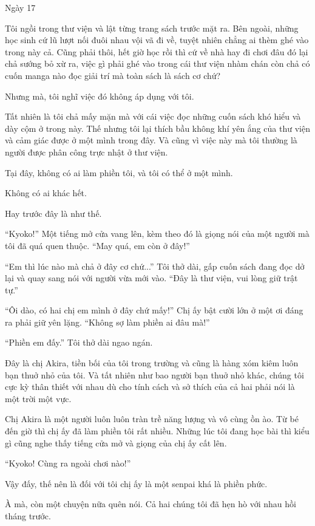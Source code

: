 {Ngày 17}
{
Tôi ngồi trong thư viện và lật từng trang sách trước mặt ra. Bên ngoài,
những học sinh cứ lũ lượt nối đuôi nhau vội vã đi về, tuyệt nhiên chẳng
ai thèm ghé vào trong này cả. Cũng phải thôi, hết giờ học rồi thì cứ về
nhà hay đi chơi đâu đó lại chả sướng bỏ xừ ra, việc gì phải ghé vào
trong cái thư viện nhàm chán còn chả có cuốn manga nào đọc giải trí mà
toàn sách là sách cơ chứ?

Nhưng mà, tôi nghĩ việc đó không áp dụng với tôi.

Tất nhiên là tôi chả mấy mặn mà với cái việc đọc những cuốn sách khó
hiểu và dày cộm ở trong này. Thế nhưng tôi lại thích bầu không khí yên
ắng của thư viện và cảm giác được ở một mình trong đây. Và cũng vì việc
này mà tôi thường là người được phân công trực nhật ở thư viện.

Tại đây, không có ai làm phiền tôi, và tôi có thể ở một mình.

Không có ai khác hết.

Hay trước đây là như thế.

``Kyoko!'' Một tiếng mở cửa vang lên, kèm theo đó là giọng nói của một
người mà tôi đã quá quen thuộc. ``May quá, em còn ở đây!''

``Em thì lúc nào mà chả ở đây cơ chứ...'' Tôi thở dài, gấp cuốn sách
đang đọc dở lại và quay sang nói với người vừa mới vào. ``Đây là thư
viện, vui lòng giữ trật tự.''

``Ôi dào, có hai chị em mình ở đây chứ mấy!'' Chị ấy bật cười lớn ở một
ơi đáng ra phải giữ yên lặng. ``Không sợ làm phiền ai đâu mà!''

``Phiền em đấy.'' Tôi thở dài ngao ngán.

Đây là chị Akira, tiền bối của tôi trong trường và cũng là hàng xóm kiêm
luôn bạn thuở nhỏ của tôi. Và tất nhiên như bao người bạn thuở nhỏ khác,
chúng tôi cực kỳ thân thiết với nhau dù cho tính cách và sở thích của cả
hai phải nói là một trời một vực.

Chị Akira là một người luôn luôn tràn trề năng lượng và vô cùng ồn ào.
Từ bé đến giờ thì chị ấy đã làm phiền tôi rất nhiều. Những lúc tôi đang
học bài thì kiểu gì cũng nghe thấy tiếng cửa mở và giọng của chị ấy cất
lên.

``Kyoko! Cùng ra ngoài chơi nào!''

Vậy đấy, thế nên là đối với tôi chị ấy là một senpai khá là phiền phức.

À mà, còn một chuyện nữa quên nói. Cả hai chúng tôi đã hẹn hò với nhau
hồi tháng trước.

}
